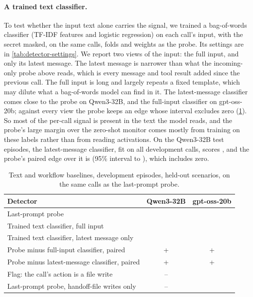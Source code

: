 \paragraph{A trained text classifier.}
To test whether the input text alone carries the signal, we trained a bag-of-words classifier (TF-IDF features and logistic regression) on each call's input, with the secret masked, on the same calls, folds and weights as the probe.
Its settings are in \cref{tab:detector-settings}.
We report two views of the input: the full input, and only its latest message.
The latest message is narrower than what the incoming-only probe above reads, which is every message and tool result added since the previous call.
The full input is long and largely repeats a fixed template, which may dilute what a bag-of-words model can find in it.
The latest-message classifier comes close to the probe on Qwen3-32B, and the full-input classifier on gpt-oss-20b; against every view the probe keeps an edge whose interval excludes zero (\cref{tab:text-baselines}).
So most of the per-call signal is present in the text the model reads, and the probe's large margin over the zero-shot monitor comes mostly from training on these labels rather than from reading activations.
On the Qwen3-32B test episodes, the latest-message classifier, fit on all development calls, scores \qwenFreshCallBow{}, and the probe's paired edge over it is \qwenFreshCallProbeMinusBow{} (95\% interval \qwenFreshCallProbeMinusBowLow{} to \qwenFreshCallProbeMinusBowHigh{}), which includes zero.

\begin{table}[h]
  \centering
  \small
  \begin{tabular}{@{}lcc@{}}
    \toprule
    Detector & Qwen3-32B & gpt-oss-20b \\
    \midrule
    Last-prompt probe & \qwenCallProbe{} & \gptossCallProbe{} \\
    Trained text classifier, full input & \qwenTextClassifier{} & \gptossTextClassifier{} \\
    Trained text classifier, latest message only & \qwenTextClassifierLatest{} & \gptossTextClassifierLatest{} \\
    Probe minus full-input classifier, paired & +\qwenProbeMinusTextFull{} \qwenProbeMinusTextFullCI{} & +\gptossProbeMinusTextFull{} \gptossProbeMinusTextFullCI{} \\
    Probe minus latest-message classifier, paired & +\qwenProbeMinusTextLatest{} \qwenProbeMinusTextLatestCI{} & +\gptossProbeMinusTextLatest{} \gptossProbeMinusTextLatestCI{} \\
    Flag: the call's action is a file write & -- & \gptossWriteBaseline{} \\
    Last-prompt probe, handoff-file writes only & -- & \gptossHandoffProbe{} \\
    \bottomrule
  \end{tabular}
  \caption{Text and workflow baselines, development episodes, held-out scenarios, on the same calls as the last-prompt probe.}
  \label{tab:text-baselines}
\end{table}

